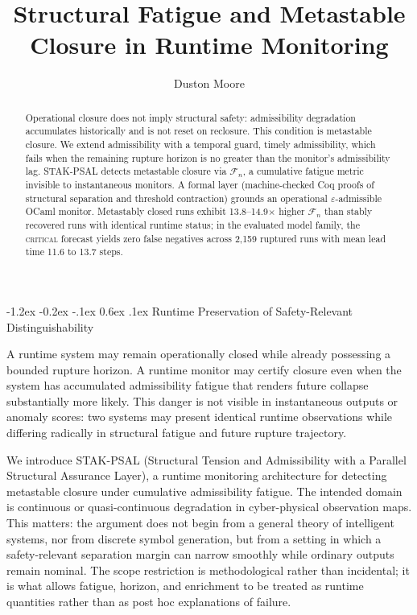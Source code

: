 \documentclass{llncs}
\makeatletter
\renewcommand\section{\@startsection{section}{1}{\z@}%
  {-1.2ex \@plus -0.2ex \@minus -.1ex}%
  {0.6ex \@plus .1ex}%
  {\normalfont\large\bfseries}}
\newcommand{\st}[1]{\textup{\textsc{#1}}}
\makeatother
\begin{document}
\title{Structural Fatigue and Metastable Closure in Runtime Monitoring}
\author{Duston Moore}
\maketitle

\begin{abstract}
Operational closure does not imply structural safety: admissibility
degradation accumulates historically and is not reset on reclosure. This
condition is metastable closure. We extend admissibility with a temporal guard, timely admissibility, which fails when the remaining rupture horizon is no greater than the monitor's admissibility lag. STAK-PSAL detects metastable closure via $\mathcal{F}_n$,
a cumulative fatigue metric invisible to instantaneous monitors. A formal
layer (machine-checked Coq proofs of structural separation and threshold contraction) grounds an operational
$\varepsilon$-admissible OCaml monitor. Metastably closed runs exhibit
13.8--14.9$\times$ higher $\mathcal{F}_n$ than stably recovered runs
with identical runtime status; in the evaluated model family, the
\st{critical} forecast yields zero false negatives across 2,159 ruptured
runs with mean lead time 11.6 to 13.7 steps.
\end{abstract}

\section{Runtime Preservation of Safety-Relevant Distinguishability}
\label{sec:problem}

A runtime system may remain operationally closed while already possessing
a bounded rupture horizon. A runtime monitor may certify closure even
when the system has accumulated admissibility fatigue that renders future
collapse substantially more likely. This danger is not visible in
instantaneous outputs or anomaly scores: two systems may present
identical runtime observations while differing radically in structural
fatigue and future rupture trajectory.

We introduce STAK-PSAL (Structural Tension and Admissibility with a
Parallel Structural Assurance Layer), a runtime monitoring architecture
for detecting metastable closure under cumulative admissibility fatigue.
The intended domain is continuous or quasi-continuous degradation in
cyber-physical observation maps. This matters: the argument does not
begin from a general theory of intelligent systems, nor from discrete
symbol generation, but from a setting in which a safety-relevant
separation margin can narrow smoothly while ordinary outputs remain
nominal. The scope restriction is methodological rather than incidental;
it is what allows fatigue, horizon, and enrichment to be treated as
runtime quantities rather than as post hoc explanations of failure.
\end{document}
